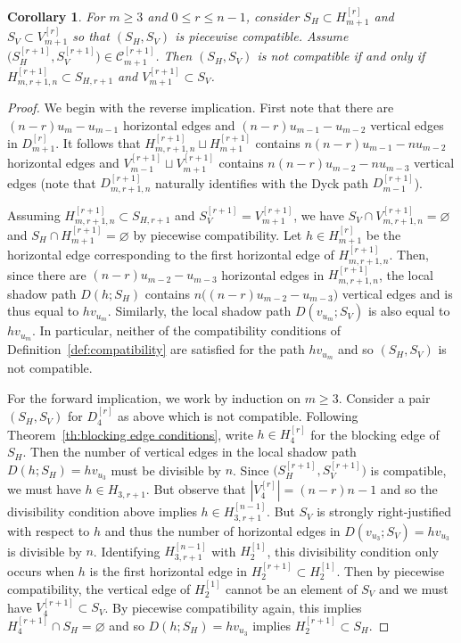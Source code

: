 \documentclass{amsart}
\newtheorem{corollary}[theorem]{Corollary}
\numberwithin{equation}{section}
\newcommand{\cC}{\mathcal{C}}
\begin{document}
\begin{corollary}
  \label{cor:piecewise not compatible}
  For $m\ge3$ and $0\le r\le n-1$, consider $S_H\subset H_{m+1}^{[r]}$ and $S_V\subset V_{m+1}^{[r]}$ so that $(S_H,S_V)$ is piecewise compatible.
  Assume $\big(S_H^{[r+1]},S_V^{[r+1]}\big)\in\cC_{m+1}^{[r+1]}$.
  Then $(S_H,S_V)$ is not compatible if and only if $H_{m,r+1,n}^{[r+1]}\subset S_{H,r+1}$ and $V_{m+1}^{[r+1]}\subset S_V$.
\end{corollary}
\begin{proof}
  We begin with the reverse implication.
  First note that there are $(n-r)u_m-u_{m-1}$ horizontal edges and $(n-r)u_{m-1}-u_{m-2}$ vertical edges in $D_{m+1}^{[r]}$. 
  It follows that $H_{m,r+1,n}^{[r+1]}\sqcup H_{m+1}^{[r+1]}$ contains $n(n-r)u_{m-1}-nu_{m-2}$ horizontal edges and $V_{m-1}^{[r+1]}\sqcup V_{m+1}^{[r+1]}$ contains $n(n-r)u_{m-2}-nu_{m-3}$ vertical edges (note that $D_{m,r+1,n}^{[r+1]}$ naturally identifies with the Dyck path $D_{m-1}^{[r+1]}$).

  Assuming $H_{m,r+1,n}^{[r+1]}\subset S_{H,r+1}$ and $S_V^{[r+1]}=V_{m+1}^{[r+1]}$, we have $S_V\cap V_{m,r+1,n}^{[r+1]}=\varnothing$ and $S_H\cap H_{m+1}^{[r+1]}=\varnothing$ by piecewise compatibility.
  Let $h\in H_{m+1}^{[r]}$ be the horizontal edge corresponding to the first horizontal edge of $H_{m,r+1,n}^{[r+1]}$.
  Then, since there are $(n-r)u_{m-2}-u_{m-3}$ horizontal edges in $H_{m,r+1,n}^{[r+1]}$, the local shadow path $D(h;S_H)$ contains $n\big((n-r)u_{m-2}-u_{m-3}\big)$ vertical edges and is thus equal to $hv_{u_m}$.
  Similarly, the local shadow path $D(v_{u_m};S_V)$ is also equal to $hv_{u_m}$.
  In particular, neither of the compatibility conditions of Definition~\ref{def:compatibility} are satisfied for the path $hv_{u_m}$ and so $(S_H,S_V)$ is not compatible.

  For the forward implication, we work by induction on $m\ge3$.
  Consider a pair $(S_H,S_V)$ for $D_4^{[r]}$ as above which is not compatible.
  Following Theorem~\ref{th:blocking edge conditions}, write $h\in H_4^{[r]}$ for the blocking edge of $S_H$.
  Then the number of vertical edges in the local shadow path $D(h;S_H)=hv_{u_3}$ must be divisible by $n$. 
  Since $\big(S_H^{[r+1]},S_V^{[r+1]}\big)$ is compatible, we must have $h\in H_{3,r+1}$.
  But observe that $|V_4^{[r]}|=(n-r)n-1$ and so the divisibility condition above implies $h\in H_{3,r+1}^{[n-1]}$.
  But $S_V$ is strongly right-justified with respect to $h$ and thus the number of horizontal edges in $D(v_{u_3};S_V)=hv_{u_3}$ is divisible by $n$.
  Identifying $H_{3,r+1}^{[n-1]}$ with $H_2^{[1]}$, this divisibility condition only occurs when $h$ is the first horizontal edge in $H_2^{[r+1]}\subset H_2^{[1]}$.
  Then by piecewise compatibility, the vertical edge of $H_2^{[1]}$ cannot be an element of $S_V$ and we must have $V_4^{[r+1]}\subset S_V$.
  By piecewise compatibility again, this implies $H_4^{[r+1]}\cap S_H=\varnothing$ and so $D(h;S_H)=hv_{u_3}$ implies $H_2^{[r+1]}\subset S_H$.


\end{proof}
\end{document}

